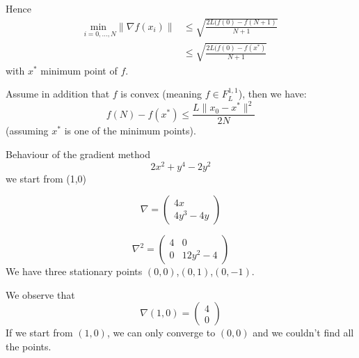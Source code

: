 Hence
\begin{align*}
\underset{i=0,...,N}{\text{min }} \|\nabla f(x_{i})\| & \leq \sqrt{\frac{2L(f(0)-f(N+1)}{N+1}} \\
& \leq \sqrt{\frac{2L(f(0)-f(x^*)}{N+1}}
\end{align*}
with $x^*$ minimum point of $f$.

\begin{lemma}
Assume in addition that $f$ is convex (meaning $f \in F^{1,1}_{L}$)\footnotemark, then we have: 
$$ f(N)-f(x^*) \leq \frac{L\|x_{0}-x^*\|^{2}}{2N} $$ 
 (assuming $x^*$ is one of the minimum points).
\end{lemma}
 
\begin{example}\begin{leftbar} Behaviour of the gradient method
$$2x^{2}+y^{4}-2y^{2}$$
we start from (1,0)

 \begin{equation*}
   \nabla=
 \begin{pmatrix}
4x  \\
4y^{3}-4y
\end{pmatrix}
\end{equation*}

\begin{equation*}
   \nabla^{2}=
 \begin{pmatrix}
4 & 0 \\
0 & 12y^{2}-4
\end{pmatrix}
\end{equation*}
We have three stationary points $(0,0)$,$(0,1)$,$(0,-1)$. 

We observe that
 \begin{equation*}
   \nabla(1,0)=
 \begin{pmatrix}
4  \\
0
\end{pmatrix}
\end{equation*}
If we start from $(1,0)$, we can only converge to $(0,0)$ and we couldn't find all the points. 
\end{leftbar}\end{example}








%
